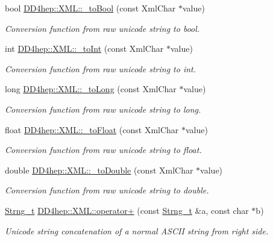 \begin{DoxyCompactItemize}
bool \hyperlink{group___d_d4_h_e_p___x_m_l_ga4f06ff5f1ca607223cda870587170546}{DD4hep::XML::\_\-toBool} (const XmlChar $\ast$value)
\begin{DoxyCompactList}\small\item\em Conversion function from raw unicode string to bool. \item\end{DoxyCompactList}\item 
int \hyperlink{group___d_d4_h_e_p___x_m_l_ga8b2fbc55c4631087c0c5e905327f04d0}{DD4hep::XML::\_\-toInt} (const XmlChar $\ast$value)
\begin{DoxyCompactList}\small\item\em Conversion function from raw unicode string to int. \item\end{DoxyCompactList}\item 
long \hyperlink{group___d_d4_h_e_p___x_m_l_ga0da6cdd75009487075f485c74a034a7b}{DD4hep::XML::\_\-toLong} (const XmlChar $\ast$value)
\begin{DoxyCompactList}\small\item\em Conversion function from raw unicode string to long. \item\end{DoxyCompactList}\item 
float \hyperlink{group___d_d4_h_e_p___x_m_l_ga74d0ba6278b3baa645887da2151279ee}{DD4hep::XML::\_\-toFloat} (const XmlChar $\ast$value)
\begin{DoxyCompactList}\small\item\em Conversion function from raw unicode string to float. \item\end{DoxyCompactList}\item 
double \hyperlink{group___d_d4_h_e_p___x_m_l_gace8029e843a4c94cf50bd9adc32cd6f6}{DD4hep::XML::\_\-toDouble} (const XmlChar $\ast$value)
\begin{DoxyCompactList}\small\item\em Conversion function from raw unicode string to double. \item\end{DoxyCompactList}\item 
\hyperlink{class_d_d4hep_1_1_x_m_l_1_1_strng__t}{Strng\_\-t} \hyperlink{group___d_d4_h_e_p___x_m_l_gad7c5e5c9ad994b97f08eec6e7829e23f}{DD4hep::XML::operator+} (const \hyperlink{class_d_d4hep_1_1_x_m_l_1_1_strng__t}{Strng\_\-t} \&a, const char $\ast$b)
\begin{DoxyCompactList}\small\item\em Unicode string concatenation of a normal ASCII string from right side. \item\end{DoxyCompactList}\item 

\end{DoxyCompactItemize}

